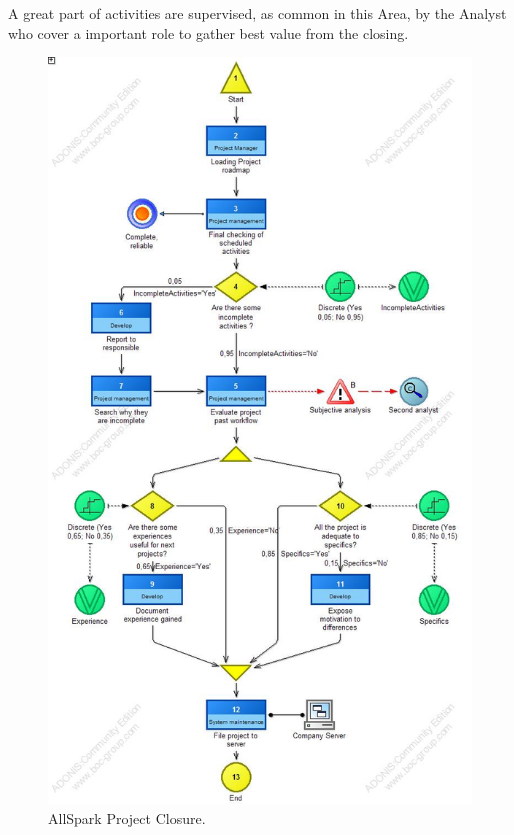 A great part of activities are supervised, as common in this Area, by the Analyst who cover a important role to gather best value from the closing.

\begin{figure}[ht!]
\begin{centering}
\includegraphics[scale=0.40]{assign2/adonis/imgs/closure.jpg}
\caption{AllSpark Project Closure.}
\label{2img:closure}
\end{centering}
\end{figure}


